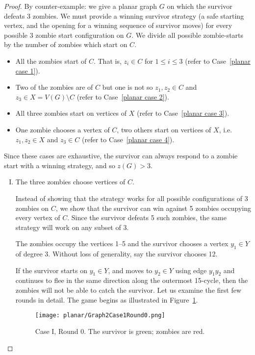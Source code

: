 \begin{proof}
  By counter-example: we give a planar graph $G$ on which the survivor defeats 3 zombies.
  We must provide a winning survivor strategy (a safe starting vertex, and the opening for a winning sequence of survivor moves) for every possible 3 zombie start configuration on $G$. We divide all possible zombie-starts by the number of zombies which start on $C$.

  \begin{itemize}
  \item All the zombies start of $C$. That is, $z_i \in C$ for $1 \leq i \leq 3$ (refer to Case~\ref{planar case 1}).
  \item Two of the zombies are of $C$ but one is not so $z_1, z_2 \in C$ and $z_3 \in X = V(G) \setminus C$ (refer to Case~\ref{planar case 2}).
  \item All three zombies start on vertices of $X$ (refer to Case~\ref{planar case 3}).
  \item One zombie chooses a vertex of $C$, two others start on vertices of $X$, i.e. $z_1, z_2 \in X$ and $z_3 \in C$ (refer to Case~\ref{planar case 4}).
  \end{itemize}

  Since these cases are exhaustive, the survivor can always respond to a zombie start with a winning
  strategy, and so $z(G) > 3$.

  \begin{enumerate}[I.]
\item The three zombies choose vertices of $C$. \label{planar case 1}

Instead of showing that the strategy works for all possible configurations of 3 zombies on $C$,
we show that the survivor can win against 5 zombies occupying every vertex of $C$.
Since the survivor defeats 5 such zombies, the same strategy will work on any subset of 3.

The zombies occupy the vertices 1--5 and the survivor chooses a vertex $y_1 \in Y$ of degree 3.
Without loss of generality, say the survivor chooses 12.

If the survivor starts on $y_1 \in Y$, and moves to $y_2\in Y$ using edge $y_1y_2$ and continues to flee in the same direction along the outermost 15-cycle, then the zombies will not be able to catch the survivor. Let us examine the first few rounds in detail. The game begins as illustrated in Figure~\ref{fig:planarG2C1R0}.

\begin{figure}
\centering
\texttt{[image: planar/Graph2Case1Round0.png]}
\caption{Case I, Round 0. The survivor is green; zombies are red.\label{fig:planarG2C1R0}}
\end{figure}


\end{enumerate}
\end{proof}
